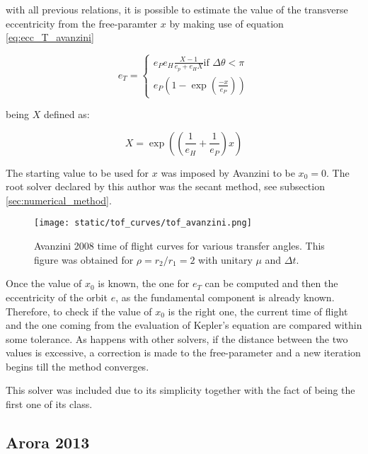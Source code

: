 with all previous relations, it is possible to estimate the value of the
transverse eccentricity from the free-paramter $x$ by making use of equation
\ref{eq:ecc_T_avanzini}

\begin{equation}
  e_T =
  \begin{cases}
    e_P e_H \frac{X - 1}{e_p + e_H X} \text{if $\Delta \theta < \pi$}\\
    e_P \left(1 - \exp{\left(\frac{-x}{e_P} \right)} \right)
  \end{cases}
  \label{eq:ecc_T_avanzini}
\end{equation}

being $X$ defined as:

\begin{equation}
	X = \exp{\left(\left(\frac{1}{e_H} + \frac{1}{e_P} \right)x\right)}
\end{equation}

The starting value to be used for $x$ was imposed by Avanzini to be $x_0 = 0$.
The root solver declared by this author was the secant method, see subsection
\ref{sec:numerical_method}.

\vspace{0.5cm}
\begin{figure}[h]
  \centering
  \texttt{[image: static/tof\_curves/tof\_avanzini.png]}
  \caption{Avanzini 2008 time of flight curves for various transfer angles. This
  figure was obtained for $\rho=r_2/r_1=2$ with unitary $\mu$ and $\Delta t$.}
  \label{fig:tof_avanzini}
\end{figure}

Once the value of $x_0$ is known, the one for $e_T$ can be computed and then
the eccentricity of the orbit $e$, as the fundamental component is already
known. Therefore, to check if the value of $x_0$ is the right one, the current
time of flight and the one coming from the evaluation of Kepler's equation are
compared within some tolerance. As happens with other solvers, if the distance
between the two values is excessive, a correction is made to the free-parameter
and a new iteration begins till the method converges.

This solver was included due to its simplicity together with the fact of being
the first one of its class.

\subsection{Arora 2013}


